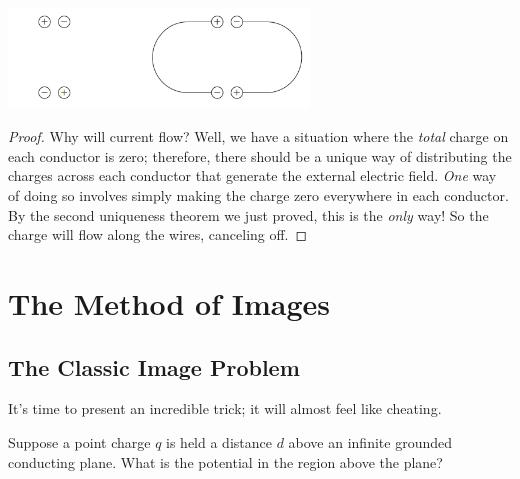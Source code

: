 \begin{center}
    \includegraphics[width=8cm]{Electrodynamics/images/fig3.7-8.PNG}
\end{center}

\begin{proof}
Why will current flow? Well, we have a situation where the \textit{total} charge on each conductor is zero; therefore, there should be a unique way of distributing the charges across each conductor that generate the external electric field. \textit{One} way of doing so involves simply making the charge zero everywhere in each conductor. By the second uniqueness theorem we just proved, this is the \textit{only} way! So the charge will flow along the wires, canceling off.
\end{proof}

\section{The Method of Images}

\subsection{The Classic Image Problem}

It's time to present an incredible trick; it will almost feel like cheating.

\begin{example}
Suppose a point charge $q$ is held a distance $d$ above an infinite grounded conducting plane. What is the potential in the region above the plane?
\end{example}

